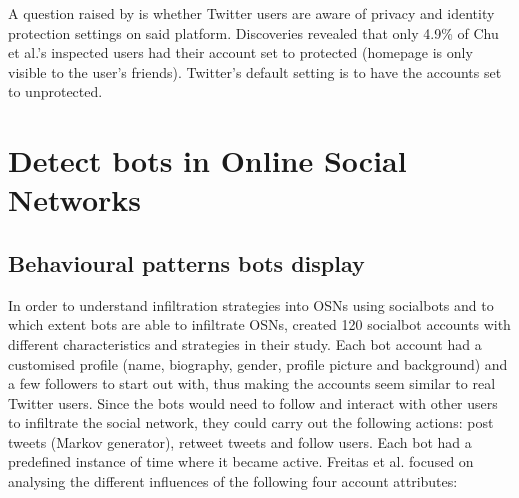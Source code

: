        \bigskip
        A question raised by \textcite[818]{DetectingAutomation} is whether Twitter users are aware of privacy and identity protection settings on said platform. Discoveries revealed that only 4.9\% of Chu et al.'s inspected users had their account set to protected (homepage is only visible to the user’s friends). Twitter’s default setting is to have the accounts set to unprotected.
    

\section{Detect bots in Online Social Networks}
\label{section:Detect}
    \subsection{Behavioural patterns bots display}
    \label{subsection:BehaviouralPatternsBotsDisplay}
    
       In order to understand infiltration strategies into OSNs using socialbots and to which extent bots are able to infiltrate OSNs, \textcite[1-4, 6-9]{ReverseEngineeringSocialbot} created 120 socialbot accounts with different characteristics and strategies in their study. Each bot account had a customised profile (name, biography, gender, profile picture and background) and a few followers to start out with, thus making the accounts seem similar to real Twitter users. Since the bots would need to follow and interact with other users to infiltrate the social network, they could carry out the following actions: post tweets (Markov generator), retweet tweets and follow users. Each bot had a predefined instance of time where it became active. Freitas et al. focused on analysing the different influences of the following four account attributes:
     
